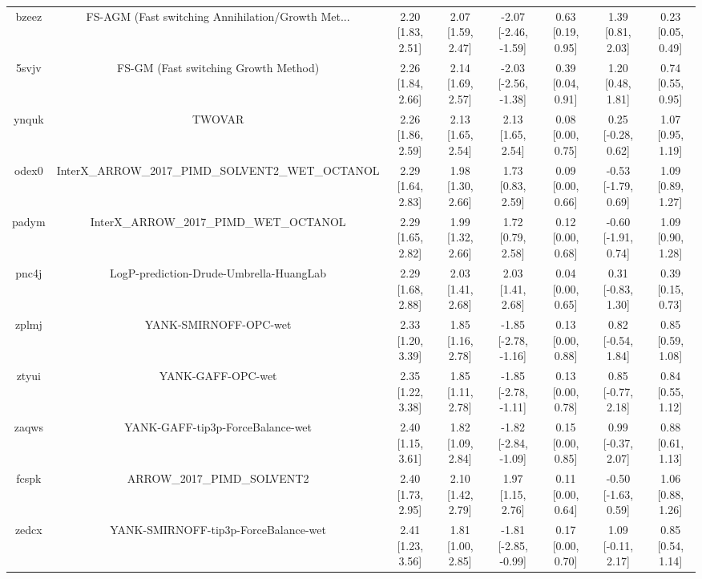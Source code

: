 \documentclass{article}
\begin{document}
\begin{center}
\begin{longtable}{|cccccccc|}
 bzeez &  FS-AGM (Fast switching Annihilation/Growth Met... &  2.20 [1.83, 2.51] &  2.07 [1.59, 2.47] &  -2.07 [-2.46, -1.59] &  0.63 [0.19, 0.95] &    1.39 [0.81, 2.03] &     0.23 [0.05, 0.49] \\
 5svjv &               FS-GM (Fast switching Growth Method) &  2.26 [1.84, 2.66] &  2.14 [1.69, 2.57] &  -2.03 [-2.56, -1.38] &  0.39 [0.04, 0.91] &    1.20 [0.48, 1.81] &     0.74 [0.55, 0.95] \\
 ynquk &                                             TWOVAR &  2.26 [1.86, 2.59] &  2.13 [1.65, 2.54] &     2.13 [1.65, 2.54] &  0.08 [0.00, 0.75] &   0.25 [-0.28, 0.62] &     1.07 [0.95, 1.19] \\
 odex0 &  InterX\_ARROW\_2017\_PIMD\_SOLVENT2\_WET\_OCTANOL &  2.29 [1.64, 2.83] &  1.98 [1.30, 2.66] &     1.73 [0.83, 2.59] &  0.09 [0.00, 0.66] &  -0.53 [-1.79, 0.69] &     1.09 [0.89, 1.27] \\
 padym &            InterX\_ARROW\_2017\_PIMD\_WET\_OCTANOL &  2.29 [1.65, 2.82] &  1.99 [1.32, 2.66] &     1.72 [0.79, 2.58] &  0.12 [0.00, 0.68] &  -0.60 [-1.91, 0.74] &     1.09 [0.90, 1.28] \\
 pnc4j &            LogP-prediction-Drude-Umbrella-HuangLab &  2.29 [1.68, 2.88] &  2.03 [1.41, 2.68] &     2.03 [1.41, 2.68] &  0.04 [0.00, 0.65] &   0.31 [-0.83, 1.30] &     0.39 [0.15, 0.73] \\
 zplmj &                              YANK-SMIRNOFF-OPC-wet &  2.33 [1.20, 3.39] &  1.85 [1.16, 2.78] &  -1.85 [-2.78, -1.16] &  0.13 [0.00, 0.88] &   0.82 [-0.54, 1.84] &     0.85 [0.59, 1.08] \\
 ztyui &                                  YANK-GAFF-OPC-wet &  2.35 [1.22, 3.38] &  1.85 [1.11, 2.78] &  -1.85 [-2.78, -1.11] &  0.13 [0.00, 0.78] &   0.85 [-0.77, 2.18] &     0.84 [0.55, 1.12] \\
 zaqws &                   YANK-GAFF-tip3p-ForceBalance-wet &  2.40 [1.15, 3.61] &  1.82 [1.09, 2.84] &  -1.82 [-2.84, -1.09] &  0.15 [0.00, 0.85] &   0.99 [-0.37, 2.07] &     0.88 [0.61, 1.13] \\
 fcspk &                        ARROW\_2017\_PIMD\_SOLVENT2 &  2.40 [1.73, 2.95] &  2.10 [1.42, 2.79] &     1.97 [1.15, 2.76] &  0.11 [0.00, 0.64] &  -0.50 [-1.63, 0.59] &     1.06 [0.88, 1.26] \\
 zedcx &               YANK-SMIRNOFF-tip3p-ForceBalance-wet &  2.41 [1.23, 3.56] &  1.81 [1.00, 2.85] &  -1.81 [-2.85, -0.99] &  0.17 [0.00, 0.70] &   1.09 [-0.11, 2.17] &     0.85 [0.54, 1.14] \\

\end{longtable}
\end{center}
\end{document}
